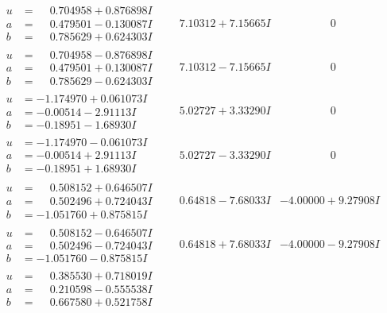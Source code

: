 \documentclass[1p]{elsarticle_modified}
\theoremstyle{definition}
\begin{document}
$$\begin{array}{c|c|c}
\begin{aligned}
u &= \phantom{-}0.704958 + 0.876898 I \\
a &= \phantom{-}0.479501 - 0.130087 I \\
b &= \phantom{-}0.785629 + 0.624303 I\end{aligned}
 & \phantom{-}7.10312 + 7.15665 I & \phantom{-0.000000 } 0 \\ \hline\begin{aligned}
u &= \phantom{-}0.704958 - 0.876898 I \\
a &= \phantom{-}0.479501 + 0.130087 I \\
b &= \phantom{-}0.785629 - 0.624303 I\end{aligned}
 & \phantom{-}7.10312 - 7.15665 I & \phantom{-0.000000 } 0 \\ \hline\begin{aligned}
u &= -1.174970 + 0.061073 I \\
a &= -0.00514 - 2.91113 I \\
b &= -0.18951 - 1.68930 I\end{aligned}
 & \phantom{-}5.02727 + 3.33290 I & \phantom{-0.000000 } 0 \\ \hline\begin{aligned}
u &= -1.174970 - 0.061073 I \\
a &= -0.00514 + 2.91113 I \\
b &= -0.18951 + 1.68930 I\end{aligned}
 & \phantom{-}5.02727 - 3.33290 I & \phantom{-0.000000 } 0 \\ \hline\begin{aligned}
u &= \phantom{-}0.508152 + 0.646507 I \\
a &= \phantom{-}0.502496 + 0.724043 I \\
b &= -1.051760 + 0.875815 I\end{aligned}
 & \phantom{-}0.64818 - 7.68033 I & -4.00000 + 9.27908 I \\ \hline\begin{aligned}
u &= \phantom{-}0.508152 - 0.646507 I \\
a &= \phantom{-}0.502496 - 0.724043 I \\
b &= -1.051760 - 0.875815 I\end{aligned}
 & \phantom{-}0.64818 + 7.68033 I & -4.00000 - 9.27908 I \\ \hline\begin{aligned}
u &= \phantom{-}0.385530 + 0.718019 I \\
a &= \phantom{-}0.210598 - 0.555538 I \\
b &= \phantom{-}0.667580 + 0.521758 I\end{aligned}

\end{array}$$
\end{document}
